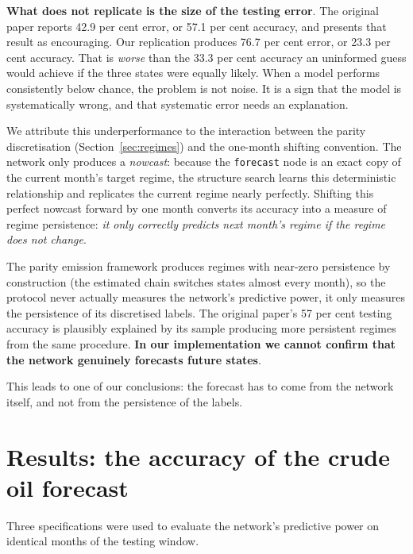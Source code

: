 \documentclass[11pt,a4paper]{article}
\begin{document}
\textbf{What does not replicate is the size of the testing error}. The original paper reports 
42.9 per cent
error, or 57.1 per cent accuracy, and presents that result as encouraging. Our replication
produces 76.7 per cent error, or 23.3 per cent accuracy. That is \textit{worse} than
the 33.3 per cent accuracy an uninformed guess would achieve if the three states were equally
likely. When a model performs consistently below chance, the problem is not noise. It
is a sign that the model is systematically wrong, and that systematic error needs an explanation.

We attribute this underperformance to the interaction between the parity discretisation 
(Section~\ref{sec:regimes}) and the one-month shifting convention. 
The network only produces a \textit{nowcast}: because the \texttt{forecast} node 
is an exact copy of the current month's target regime, the structure search 
learns this deterministic relationship and replicates the current regime 
nearly perfectly. Shifting this perfect nowcast forward by one month converts 
its accuracy into a measure of regime persistence: \textit{it only correctly predicts 
next month's regime if the regime does not change}. 

The parity emission framework 
produces regimes with near-zero persistence by construction (the estimated chain 
switches states almost every month), so the protocol never actually measures the 
network's predictive power, it only measures the persistence of its discretised labels. 
The original paper's 57 per cent testing accuracy is plausibly 
explained by its sample producing more persistent regimes from the same 
procedure. \textbf{In our implementation we cannot confirm that the network 
genuinely forecasts future states}.

This leads to one of our conclusions: the forecast has to come from the network itself, and not
from the persistence of the labels.

\section{Results: the accuracy of the crude oil forecast}
\label{sec:results}

Three specifications were used to evaluate the network's predictive power on identical 
months of the testing window.
\end{document}

